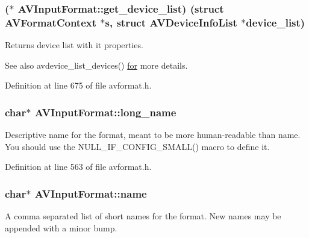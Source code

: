 \subsubsection[{\texorpdfstring{get\+\_\+device\+\_\+list}{get_device_list}}]{($\ast$ A\+V\+Input\+Format\+::get\+\_\+device\+\_\+list) (struct {\bf A\+V\+Format\+Context} $\ast${\bf s}, struct A\+V\+Device\+Info\+List $\ast$device\+\_\+list)}\hypertarget{struct_a_v_input_format_a904104dc65359b800012d7abd01bb8e7}{}\label{struct_a_v_input_format_a904104dc65359b800012d7abd01bb8e7}
Returns device list with it properties. \begin{DoxySeeAlso}{See also}
avdevice\+\_\+list\+\_\+devices() \hyperlink{hashrout_8h_a63bdfbdfaa50cfc85afcbff4ce2c16a6}{for} more details. 
\end{DoxySeeAlso}


Definition at line 675 of file avformat.\+h.

\subsubsection[{\texorpdfstring{long\+\_\+name}{long_name}}]{ char$\ast$ A\+V\+Input\+Format\+::long\+\_\+name}\hypertarget{struct_a_v_input_format_a1f67064a527941944017f1dfe65d3aa9}{}\label{struct_a_v_input_format_a1f67064a527941944017f1dfe65d3aa9}
Descriptive name for the format, meant to be more human-\/readable than name. You should use the N\+U\+L\+L\+\_\+\+I\+F\+\_\+\+C\+O\+N\+F\+I\+G\+\_\+\+S\+M\+A\+L\+L() macro to define it. 

Definition at line 563 of file avformat.\+h.

\subsubsection[{\texorpdfstring{name}{name}}]{ char$\ast$ A\+V\+Input\+Format\+::name}\hypertarget{struct_a_v_input_format_a850db3eb225e22b64f3304d72134ca0c}{}\label{struct_a_v_input_format_a850db3eb225e22b64f3304d72134ca0c}
A comma separated list of short names for the format. New names may be appended with a minor bump. 

